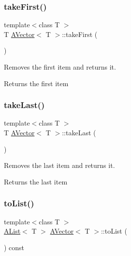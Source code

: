 \subsubsection{\texorpdfstring{takeFirst()}{takeFirst()}}
{\footnotesize\ttfamily template$<$class T $>$ \\
T \mbox{\hyperlink{class_a_vector}{A\+Vector}}$<$ T $>$\+::take\+First (\begin{DoxyParamCaption}{ }\end{DoxyParamCaption})}



Removes the first item and returns it. 

\begin{DoxyReturn}{Returns}
the first item 
\end{DoxyReturn}
\mbox{\label{class_a_vector_abaa54e33aa13edba5b2e4cad679f5c1b}} 
\subsubsection{\texorpdfstring{takeLast()}{takeLast()}}
{\footnotesize\ttfamily template$<$class T $>$ \\
T \mbox{\hyperlink{class_a_vector}{A\+Vector}}$<$ T $>$\+::take\+Last (\begin{DoxyParamCaption}{ }\end{DoxyParamCaption})}



Removes the last item and returns it. 

\begin{DoxyReturn}{Returns}
the last item 
\end{DoxyReturn}
\mbox{\label{class_a_vector_a3cdb7d87eb47e91445928d54972197fc}} 
\subsubsection{\texorpdfstring{toList()}{toList()}}
{\footnotesize\ttfamily template$<$class T $>$ \\
\mbox{\hyperlink{class_a_list}{A\+List}}$<$ T $>$ \mbox{\hyperlink{class_a_vector}{A\+Vector}}$<$ T $>$\+::to\+List (\begin{DoxyParamCaption}{ }\end{DoxyParamCaption}) const\hspace{0.3cm}{\ttfamily [inline]}}



